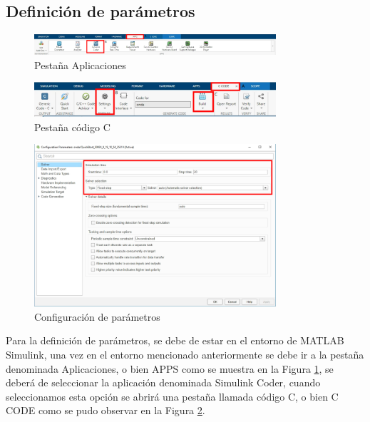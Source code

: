 \subsection{Definición de parámetros}

\begin{figure}[h!]
    \centering
    \includegraphics[width=0.8\textwidth]{fig/especifico_2/M2MT/paso_a_paso_mtmt/apps.pdf}
    \caption{Pestaña Aplicaciones}
    \label{fig:pestana_apps}
\end{figure}

\begin{figure}[h!]
    \centering
    \includegraphics[width=0.8\textwidth]{fig/especifico_2/M2MT/paso_a_paso_mtmt/c_code.pdf}
    \caption{Pestaña código C}
    \label{fig:pestana_c_code}
\end{figure}

\begin{figure}[h!]
    \centering
    \includegraphics[width=0.8\textwidth]{fig/especifico_2/M2MT/paso_a_paso_mtmt/configuration_parameters.pdf}
    \caption{Configuración de parámetros}
    \label{fig:pestana_config}
\end{figure}

Para la definición de parámetros, se debe de estar en el entorno de MATLAB Simulink, una vez en el entorno mencionado anteriormente se debe ir a la pestaña denominada Aplicaciones, o bien APPS como se muestra en la Figura \ref{fig:pestana_apps}, se deberá de seleccionar la aplicación denominada Simulink Coder, cuando seleccionamos esta opción se abrirá una pestaña llamada código C, o bien C CODE como se pudo observar en la Figura \ref{fig:pestana_c_code}.

